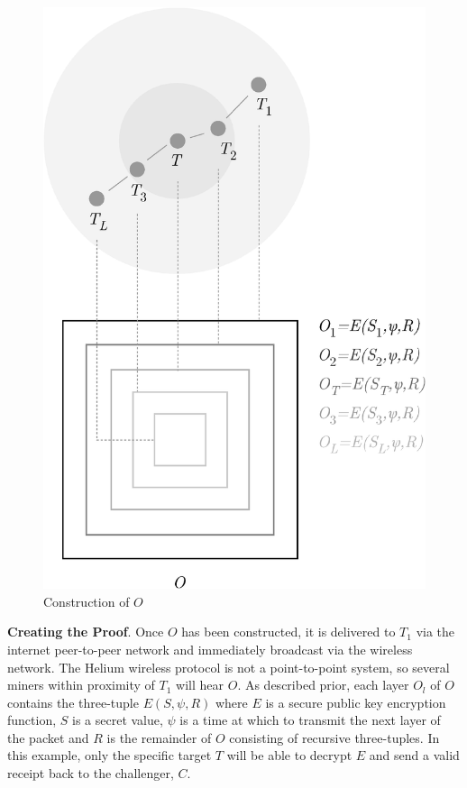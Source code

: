 \documentclass[10pt, nonatbib, nocopyrightspace, reprint]{sigplanconf}
\begin{document}
\begin{figure}[H]
    \begin{center}
          \includegraphics[width=\columnwidth]{o_construction.eps}
          \caption{Construction of $O$}
          \label{fig:poc-o_construction}
     \end{center}
\end{figure}

\textbf{Creating the Proof}. Once $O$ has been constructed, it is delivered to $T_1$ via the internet peer-to-peer network and immediately broadcast via the wireless network. The Helium wireless protocol is not a point-to-point system, so several miners within proximity of $T_1$ will hear $O$. As described prior, each layer $O_l$ of $O$ contains the three-tuple ${E\left(S, \psi, R\right)}$ where $E$ is a secure public key encryption function, $S$ is a secret value, $\psi$ is a time at which to transmit the next layer of the packet and $R$ is the remainder of $O$ consisting of recursive three-tuples. In this example, only the specific target $T$ will be able to decrypt $E$ and send a valid receipt back to the challenger, $C$.
\end{document}
